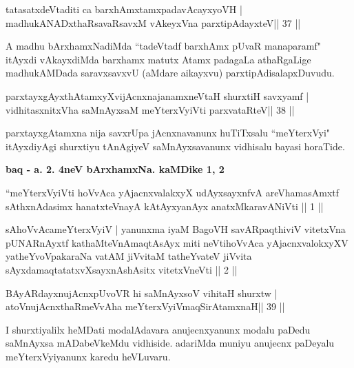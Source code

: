 \begin{shl}
tatasatxdeVtaditi ca barxhAmxtamxpadavAcayxyoVH |
madhukANADxthaRsavaRsavxM vAkeyxVna parxtipAdayxteV\hfill || 37 ||
\end{shl}

\begin{artha}
A madhu bArxhamxNadiMda ``tadeVtadf barxhAmx pUvaR manaparamf" itAyxdi vAkayxdiMda barxhamx matutx Atamx padagaLa athaRgaLige madhukAMDada saravxsavxvU (aMdare aikayxvu) parxtipAdisalapxDuvudu.
\end{artha}


\begin{shl}
parxtayxgAyxthAtamxyXvijAcnxnajanamxneV\s taH shurxtiH savxyamf |
vidhitasxnitxVha saMnAyxsaM meYterxVyiVti parxvataRteV\hfill || 38 ||
\end{shl}

\begin{artha}
parxtayxgAtamxna nija savxrUpa jAcnxnavanunx huTiTxsalu ``meYterxVyi" itAyxdiyAgi shurxtiyu tAnAgiyeV saMnAyxsavanunx vidhisalu bayasi horaTide.
\end{artha}

\begin{center}
\textbf{baq - a. 2. 4neV bArxhamxNa. kaMDike 1, 2}
\end{center}

\begin{shl}
``meYterxVyiVti hoVvAca yAjacnxvalakxyX udAyxsayxnfvA 
areV\s hamasAmxtf sAthxnAdasimx hanatxteV\s nayA
kAtAyxyanAyx anatxMkaravANiVti || 1 ||

sAhoVvAcameYterxVyiV | yanunxma iyaM BagoVH
savARpaqthiviV vitetxVna pUNARnAyxtf kathaMteVnA\s maqtAsAyx
miti neVtihoVvAca yAjacnxvalokxyXV yatheYvoVpakaraNa
vatAM jiVvitaM tatheYvateV jiVvita sAyxdamaqtatatxvXsayxnAshAsitx
vitetxVneVti || 2 ||
\end{shl}


\begin{shl}
BAyARdayxnujAcnxpUvoVR hi saMnAyxsoV vihitaH shurxtw |
atoV\s nujAcnxthaRmeVvA\s\s ha meYterxVyiVmaqSirAtamxnaH\hfill || 39 ||
\end{shl}

\begin{artha}
I shurxtiyalilx heMDati modalAdavara anujecnxyanunx modalu paDedu saMnAyxsa mADabeVkeMdu vidhiside. adariMda muniyu anujecnx paDeyalu meYterxVyiyanunx karedu heVLuvaru.
\end{artha}

